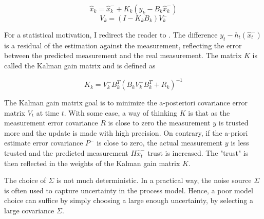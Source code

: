 \documentclass[mscthesis]{usiinfthesis}
\begin{document}
\[
\hat{x}_k = \hat{x}_k^- + K_k (y_k - B_k \hat{x}_k^-)
\]
\[
V_k = (I-K_k B_k)V_k^-
\]



For a statistical motivation, I redirect the reader to \citet{paper:Maybeck79}. The difference $y_t - h_t(\hat{x}_t^-)$ is a residual of the estimation against the measurement, reflecting the error between the predicted measurement and the real measurement. The matrix $K$ is called the Kalman gain matrix and is defined as 


\[
K_k = V_k^- B^T_k (B_k V_k^- B^T_k + R_k)^{-1}
\]




The Kalman gain matrix goal is to minimize the a-posteriori covariance error matrix $V_t$ at time $t$. With some ease, a way of thinking $K$ is that as the measurement error covariance $R$ is close to zero the measurement $y$ is trusted more and the update is made with high precision. On contrary, if the a-priori estimate error covariance $P^-$ is close to zero, the actual measurement $y$ is less trusted and the predicted measurement $H\hat{x}_t^-$ trust is increased. The "trust" is then reflected in the weights of the Kalman gain matrix $K$.



The choice of $\Sigma$ is not much deterministic. In a practical way, the noise source $\Sigma$ is often used to capture uncertainty in the process model. Hence, a poor model choice can suffice by simply choosing a large enough uncertainty, by selecting a large covariance $\Sigma$. 


\end{document}
